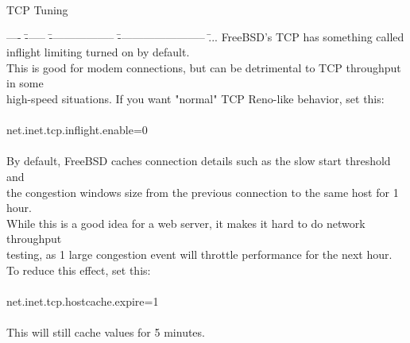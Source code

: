 \documentclass[xcolor=dvipsnames]{beamer}
\begin{document}
	\begin{frame}{TCP Tuning}
	\scriptsize
	{
	\begin{tabbing}
		---- \= ------ \= ------------------ \= ------------------------ \=  ... \kill
		FreeBSD's TCP has something called inflight limiting turned on by default. 
		\\ This is good for modem connections, but can be detrimental to TCP throughput in some 
		\\ high-speed situations. If you want "normal" TCP Reno-like behavior, set this:\\ \\
		\> net.inet.tcp.inflight.enable=0 \\
		\\ By default, FreeBSD caches connection details such as the slow start threshold and 
		\\ the congestion windows size from the previous connection to the same host for 1 hour. 
		\\ While this is a good idea for a web server, it makes it hard to do network throughput 
		\\ testing, as 1 large congestion event will throttle performance for the next hour. 
		\\ To reduce this effect, set this:\\ \\
		\> net.inet.tcp.hostcache.expire=1\\
		\\ This will still cache values for 5 minutes.
	\end{tabbing}
	}
	\end{frame}
		
\end{document}
